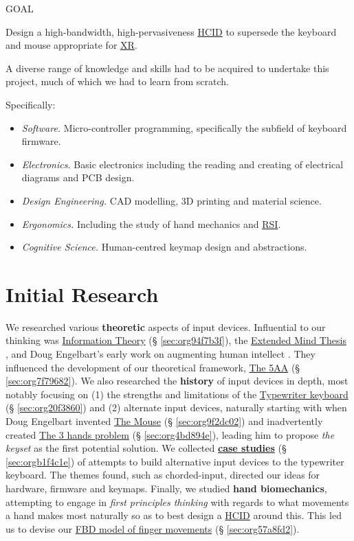 \documentclass[logo,bsc,singlespacing,parskip]{infthesis}
\begin{document}
\begin{mdframed}
\begin{description}
\item[{GOAL}] 
\end{description}

Design a high-bandwidth, high-pervasiveness \hyperref[org0c83164]{HCID} to supersede the keyboard and mouse appropriate for \hyperref[org39cbd51]{XR}.
\end{mdframed}

A diverse range of knowledge and skills had to be acquired to undertake this project, much of which we had to learn from scratch.

Specifically:
\begin{itemize}
\item \emph{Software.} Micro-controller programming, specifically the subfield of keyboard firmware.
\item \emph{Electronics.} Basic electronics including the reading and creating of electrical diagrams and PCB design.
\item \emph{Design Engineering.} CAD modelling, 3D printing and material science.
\item \emph{Ergonomics.} Including the study of hand mechanics and \hyperref[org77f0234]{RSI}.
\item \emph{Cognitive Science.} Human-centred keymap design and abstractions.
\end{itemize}
\chapter{Initial Research}
\label{sec:orge0c8edf}
We researched various \textbf{theoretic} aspects of input devices.
Influential to our thinking was \hyperref[sec:org94f7b3f]{Information Theory} (§ \ref{sec:org94f7b3f}), the \hyperref[extended mind thesis]{Extended Mind Thesis} \autocite{ExtendedMindAndy}, and Doug Engelbart's early work on augmenting human intellect \autocite{engelbartAugmentingHumanIntellect1962}.
They influenced the development of our theoretical framework, \hyperref[sec:org7f79682]{The 5AA} (§ \ref{sec:org7f79682}).
We also researched the \textbf{history} of input devices in depth, most notably focusing on (1) the strengths and limitations of the \hyperref[sec:org20f3860]{Typewriter keyboard} (§ \ref{sec:org20f3860}) and (2) alternate input devices, naturally starting with when Doug Engelbart invented \hyperref[sec:org9f2dc02]{The Mouse} (§ \ref{sec:org9f2dc02}) and inadvertently created \hyperref[sec:org4bd894e]{The 3 hands problem} (§ \ref{sec:org4bd894e}), leading him to propose \emph{the keyset} as the first potential solution.
We collected \hyperref[sec:orgb1f4c1e]{\textbf{case studies}} (§ \ref{sec:orgb1f4c1e}) of attempts to build alternative input devices to the typewriter keyboard.
The themes found, such as chorded-input, directed our ideas for hardware, firmware and keymaps.
Finally, we studied \textbf{hand biomechanics}, attempting to engage in \emph{first principles thinking} with regards to what movements a hand makes most naturally so as to best design a \hyperref[org0c83164]{HCID} around this.
This led us to devise our \hyperref[sec:org57a8fd2]{FBD model of finger movements} (§ \ref{sec:org57a8fd2}).
\end{document}
